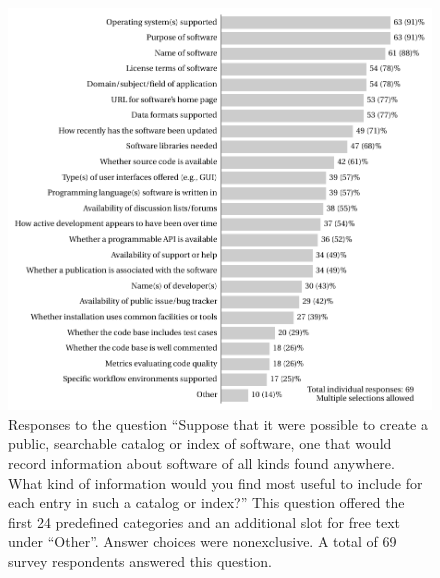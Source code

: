 \documentclass{casicswhitepaper}
\begin{document}
\begin{figure}[t]
  \centering
  \includegraphics[width=6.1in]{files/plots/info-to-include-in-index.pdf}
  \vspace*{-5ex}
  \caption{Responses to the question ``Suppose that it were possible to create a public, searchable catalog or index of software, one that would record information about software of all kinds found anywhere.  What kind of information would you find most useful to include for each entry in such a catalog or index?'' This question offered the first 24 predefined categories and an additional slot for free text under ``Other''.  Answer choices were nonexclusive.  A total of 69 survey respondents answered this question.}
  \label{info-to-include}
\end{figure}

% 
\end{document}
